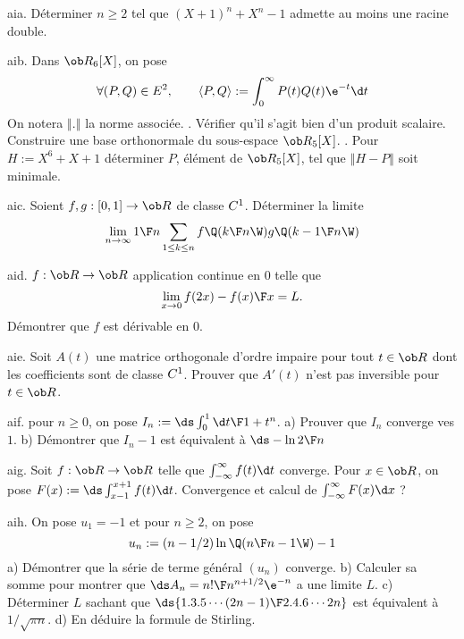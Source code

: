 \exo [Level=1,Fight=1,Learn=1,Field=\Polynômes,Type=\Exercices,Origin=] aia. 
Déterminer $n\ge2$ tel que $(X+1)^n+X^n-1$ admette au moins une racine double. 

\exo [Level=1,Fight=1,Learn=1,Type=\Maple,Field=\Orthonormalisation,Origin=\BanquePT] aib. 
Dans $\ob R_6[X]$, on pose
$$
\forall(P,Q)\in E^2, \qquad \langle P, Q\rangle :=\int_0^\infty P(t)Q(t)\e^{-t}\d t
$$
On notera $\left\Vert . \right\Vert$ la norme associée. . Vérifier qu'il s'agit bien d'un produit scalaire. Construire une base orthonormale du sous-espace $\ob R_5[X]$. . Pour $H:=X^6+X+1$ déterminer $P$, élément de $\ob R_5[X]$, tel que $\left\Vert H-P\right\Vert$ soit minimale.



\exo [Level=1,Fight=2,Learn=1,Field=\SommesDeRiemann,Type=\Exercices,Origin=X] aic. 
Soient $f,g:[0,1]\to\ob R$ de classe $\sc C^1$. Déterminer la limite
$$
\lim_{n\to\infty}{1\F n}\sum_{1\le k\le n}f\Q({k\F n}\W)g\Q({k-1\F n}\W)
$$

\exo [Level=1,Fight=2,Learn=1,Field=\Dérivation,Type=\Exercices,Origin=] aid. 
$f:\ob R\to\ob R$ application continue en $0$ telle que 
$$
\lim_{x\to0}{f(2x)-f(x)\F x}=L.
$$ 
Démontrer que $f$ est dérivable en $0$. 

\exo [Level=2,Fight=3,Learn=1,Field=\MatricesOrthogonales,Type=\Exercices,Origin=] aie. 
Soit $A(t)$ une matrice orthogonale d'ordre impaire pour tout $t\in \ob R$ dont les coefficients sont de classe $\sc C^1$. 
Prouver que $A'(t)$ n'est pas inversible pour $t\in\ob R$. 

\exo [Level=2,Fight=2,Learn=1,Field=\FonctionsDéfiniesParUneIntégrale,Type=\Exercices,Origin=] aif. 
pour $n\ge0$, on pose $I_n:=\ds\int_0^1{\d t\F1+t^n}$. \pn
a) Prouver que $I_n$ converge ves $1$. \pn
b) Démontrer que $I_n-1$ est équivalent à $\ds-{\ln2\F n}$

\exo [Level=2,Fight=2,Learn=1,Field=\FonctionsDéfiniesParUneIntégrale,Type=\Exercices,Origin=] aig. 
Soit $f:\ob R\to\ob R$ telle que $\int_{-\infty}^\infty f(t)\d t$ converge. 
Pour $x\in\ob R$, on pose $F(x):=\ds \int_{x-1}^{x+1}f(t)\d t$. \pn
Convergence et calcul de $\int_{-\infty}^\infty F(x)\d x$ ? 

\exo [Level=2,Fight=2,Learn=2,Field=\SériesNumériques,Type=\Exercices,Origin=] aih. 
On pose $u_1=-1$ et pour $n\ge2$, on pose
$$
u_n:=(n-1/2)\ln\Q({n\F n-1}\W)-1
$$
a) Démontrer que la série de terme général $(u_n)$ converge. \pn
b) Calculer sa somme pour montrer que $\ds A_n={n!\F n^{n+1/2}\e^{-n}}$ a une limite $L$. \pn
c) Déterminer $L$ sachant que $\ds{1.3.5\cdots(2n-1)\F2.4.6\cdots 2n}$ est équivalent à $1/\sqrt{\pi n}$. \pn
d) En déduire la formule de Stirling. 


